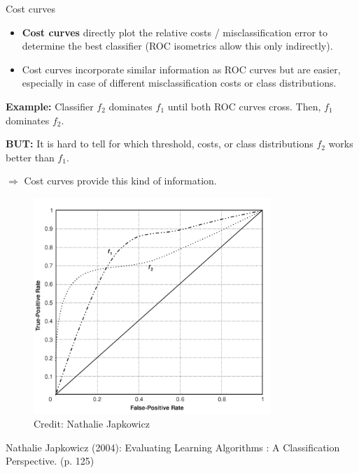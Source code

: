 \documentclass[11pt,compress,t,notes=noshow, xcolor=table]{beamer}
\begin{document}
\begin{vbframe}{Cost curves}

\begin{itemize}
  \item \textbf{Cost curves} directly plot the relative costs / misclassification error to determine the best classifier (ROC isometrics allow this only indirectly).
  \item Cost curves incorporate similar information as ROC curves but are easier, especially in case of different misclassification costs or class distributions. %
\end{itemize}
\vspace{-0.1cm}
\begin{minipage}{0.5\textwidth}
\textbf{Example:} Classifier $f_2$ dominates $f_1$ until both ROC curves cross. Then, $f_1$ dominates $f_2$.

\textbf{BUT:} It is hard to tell for which threshold, costs, or class distributions $f_2$ works better than $f_1$.

$\Rightarrow$ Cost curves provide this kind of information.
\end{minipage}
\begin{minipage}{0.49\textwidth}

\begin{figure}
    \centering
    \includegraphics[width=0.8\textwidth]{figure_man/cost-curves-1.png}
    \tiny{\\ Credit: Nathalie Japkowicz  \\}
\end{figure}



\end{minipage}
\vspace{1.5 cm}
{\tiny{Nathalie Japkowicz (2004): Evaluating Learning Algorithms : A Classification Perspective. (p. 125)}}



\end{vbframe}
\end{document}
